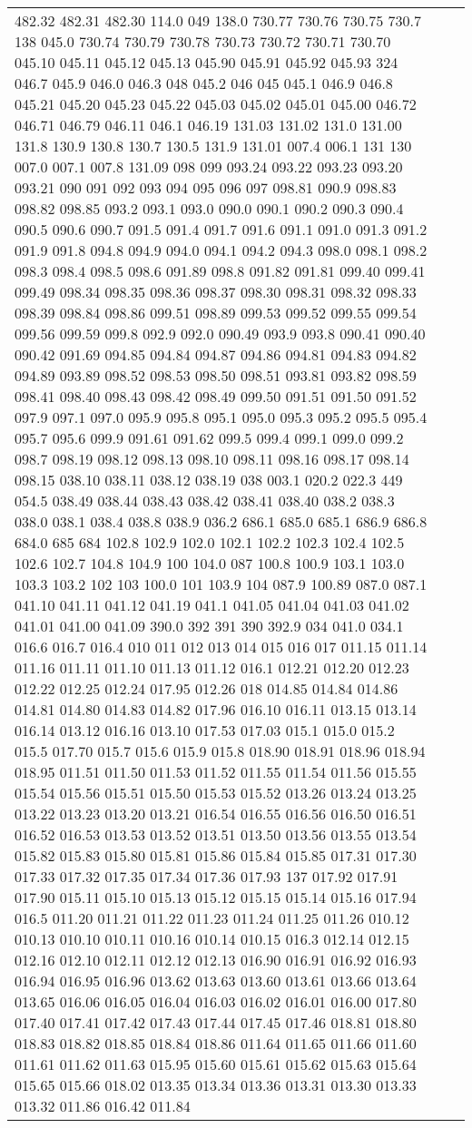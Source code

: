 \begin{longtable}{|R{.05in}|L{.65in}||L{5.65in}|}
482.32 482.31 482.30 114.0 049 138.0 730.77 730.76 730.75 730.7 138 045.0 730.74 730.79 730.78 730.73 730.72 730.71 730.70 045.10 045.11 045.12 045.13 045.90 045.91 045.92 045.93 324 046.7 045.9 046.0 046.3 048 045.2 046 045 045.1 046.9 046.8 045.21 045.20 045.23 045.22 045.03 045.02 045.01 045.00 046.72 046.71 046.79 046.11 046.1 046.19 131.03 131.02 131.0 131.00 131.8 130.9 130.8 130.7 130.5 131.9 131.01 007.4 006.1 131 130 007.0 007.1 007.8 131.09 098 099 093.24 093.22 093.23 093.20 093.21 090 091 092 093 094 095 096 097 098.81 090.9 098.83 098.82 098.85 093.2 093.1 093.0 090.0 090.1 090.2 090.3 090.4 090.5 090.6 090.7 091.5 091.4 091.7 091.6 091.1 091.0 091.3 091.2 091.9 091.8 094.8 094.9 094.0 094.1 094.2 094.3 098.0 098.1 098.2 098.3 098.4 098.5 098.6 091.89 098.8 091.82 091.81 099.40 099.41 099.49 098.34 098.35 098.36 098.37 098.30 098.31 098.32 098.33 098.39 098.84 098.86 099.51 098.89 099.53 099.52 099.55 099.54 099.56 099.59 099.8 092.9 092.0 090.49 093.9 093.8 090.41 090.40 090.42 091.69 094.85 094.84 094.87 094.86 094.81 094.83 094.82 094.89 093.89 098.52 098.53 098.50 098.51 093.81 093.82 098.59 098.41 098.40 098.43 098.42 098.49 099.50 091.51 091.50 091.52 097.9 097.1 097.0 095.9 095.8 095.1 095.0 095.3 095.2 095.5 095.4 095.7 095.6 099.9 091.61 091.62 099.5 099.4 099.1 099.0 099.2 098.7 098.19 098.12 098.13 098.10 098.11 098.16 098.17 098.14 098.15 038.10 038.11 038.12 038.19 038 003.1 020.2 022.3 449 054.5 038.49 038.44 038.43 038.42 038.41 038.40 038.2 038.3 038.0 038.1 038.4 038.8 038.9 036.2 686.1 685.0 685.1 686.9 686.8 684.0 685 684 102.8 102.9 102.0 102.1 102.2 102.3 102.4 102.5 102.6 102.7 104.8 104.9 100 104.0 087 100.8 100.9 103.1 103.0 103.3 103.2 102 103 100.0 101 103.9 104 087.9 100.89 087.0 087.1 041.10 041.11 041.12 041.19 041.1 041.05 041.04 041.03 041.02 041.01 041.00 041.09 390.0 392 391 390 392.9 034 041.0 034.1 016.6 016.7 016.4 010 011 012 013 014 015 016 017 011.15 011.14 011.16 011.11 011.10 011.13 011.12 016.1 012.21 012.20 012.23 012.22 012.25 012.24 017.95 012.26 018 014.85 014.84 014.86 014.81 014.80 014.83 014.82 017.96 016.10 016.11 013.15 013.14 016.14 013.12 016.16 013.10 017.53 017.03 015.1 015.0 015.2 015.5 017.70 015.7 015.6 015.9 015.8 018.90 018.91 018.96 018.94 018.95 011.51 011.50 011.53 011.52 011.55 011.54 011.56 015.55 015.54 015.56 015.51 015.50 015.53 015.52 013.26 013.24 013.25 013.22 013.23 013.20 013.21 016.54 016.55 016.56 016.50 016.51 016.52 016.53 013.53 013.52 013.51 013.50 013.56 013.55 013.54 015.82 015.83 015.80 015.81 015.86 015.84 015.85 017.31 017.30 017.33 017.32 017.35 017.34 017.36 017.93 137 017.92 017.91 017.90 015.11 015.10 015.13 015.12 015.15 015.14 015.16 017.94 016.5 011.20 011.21 011.22 011.23 011.24 011.25 011.26 010.12 010.13 010.10 010.11 010.16 010.14 010.15 016.3 012.14 012.15 012.16 012.10 012.11 012.12 012.13 016.90 016.91 016.92 016.93 016.94 016.95 016.96 013.62 013.63 013.60 013.61 013.66 013.64 013.65 016.06 016.05 016.04 016.03 016.02 016.01 016.00 017.80 017.40 017.41 017.42 017.43 017.44 017.45 017.46 018.81 018.80 018.83 018.82 018.85 018.84 018.86 011.64 011.65 011.66 011.60 011.61 011.62 011.63 015.95 015.60 015.61 015.62 015.63 015.64 015.65 015.66 018.02 013.35 013.34 013.36 013.31 013.30 013.33 013.32 011.86 016.42 011.84 
\end{longtable}
